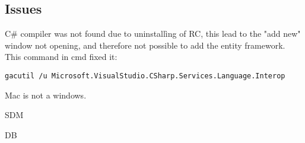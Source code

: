 \subsection{Issues}
C\# compiler was not found due to uninstallìng of RC, this lead to the "add new" window not opening, and therefore not possible to add the entity framework.\\
This command in cmd fixed it:
\begin{verbatim}
gacutil /u Microsoft.VisualStudio.CSharp.Services.Language.Interop 
\end{verbatim}


Mac is not a windows.

SDM

DB